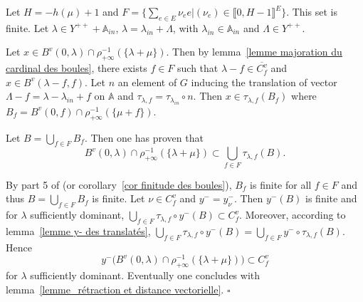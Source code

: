 \documentclass[12pt]{article}
\theoremstyle{plain}
\theoremstyle{definition}
\newcommand{\A}{\mathbb{A}}
\begin{document}
\vspace{3mm}
Let $H=-h(\mu)+1$ and $F=\{\sum_{e\in E}\nu_e e|(\nu_e)\in \llbracket 0,H-1\rrbracket^E\}$. This set is finite. Let $\lambda\in Y^{++}+\A_{in}$, $\lambda=\lambda_{in}+\Lambda$, with $\lambda_{in}\in \A_{in}$ and $\Lambda\in Y^{++}$.

Let $x\in B^v(0,\lambda)\cap \rho_{+\infty}^{-1}(\{\lambda+\mu\})$. Then by lemma~\ref{lemme majoration du cardinal des boules}, there exists $f\in F$ such that $\lambda-f\in \overline{C^v_f}$ and $x\in B^v(\lambda-f,f)$. Let $n$ an element of $G$ inducing the translation of vector $\Lambda-f=\lambda-\lambda_{in}+f$ on $\A$ and $\tau_{\lambda,f}=\tau_{\lambda_{in}}\circ n$. Then $x\in\tau_{\lambda,f}(B_f)$ where $B_f=B^v(0,f)\cap \rho_{+\infty}^{-1}(\{\mu +f\})$.

Let $B=\bigcup_{f\in F}B_f$. Then one has proven that \[B^v(0,\lambda)\cap \rho_{+\infty}^{-1}(\{\lambda+\mu\})\subset \bigcup_{f\in F}\tau_{\lambda,f}(B).\]

By part 5 of \cite{gaussent2014spherical} (or corollary~\ref{cor finitude des boules}), $B_f$ is finite for all $f\in F$ and thus $B=\bigcup_{f\in F}B_f$ is finite.  Let $\nu\in C_f^v$ and $y^-=y_\nu^-$. Then $y^-(B)$ is finite and for $\lambda$ sufficiently dominant, $\bigcup_{f\in F}\tau_{\lambda,f}\circ y^-(B) \subset{C^v_f}$. Moreover, according to lemma~\ref{lemme y- des translatés}, $\bigcup_{f\in F}\tau_{\lambda,f}\circ y^-(B)=\bigcup_{f\in F}y^-\circ \tau_{\lambda,f}(B)$. Hence \[y^-\big(B^v(0,\lambda)\cap \rho_{+\infty}^{-1}(\{\lambda+\mu\})\big)\subset C^v_f\] for $\lambda$ sufficiently dominant. Eventually one concludes with lemma~\ref{lemme_rétraction et distance vectorielle}. $\square$




 


 
\end{document}
